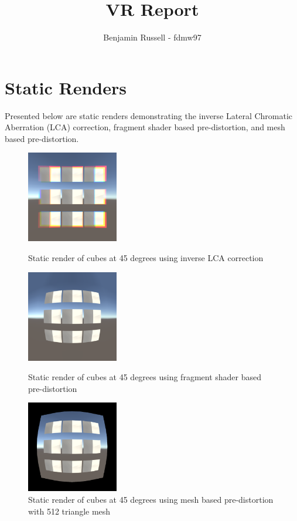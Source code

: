 \documentclass[]{article}
\title{VR Report}
\author{Benjamin Russell - fdmw97}
\date{}
\begin{document}
\maketitle

\section{Static Renders}
Presented below are static renders demonstrating the inverse Lateral Chromatic Aberration (LCA) correction, fragment shader based pre-distortion, and mesh based pre-distortion.
\begin{figure}[h!]
	\centering
	\begin{minipage}[H]{0.2\textwidth}
		\includegraphics[width=4cm]{LCA_45}
		\caption{Static render of cubes at 45 degrees using inverse LCA correction}
		\label{fig:lca_45}
	\end{minipage}
	\hfill
	\begin{minipage}[H]{0.2\textwidth}
		\includegraphics[width=4cm]{Barrel_Frag_45}
		\caption{Static render of cubes at 45 degrees using fragment shader based pre-distortion}
		\label{fig:frag_45}
	\end{minipage}
	\hfill
	\begin{minipage}[H!]{0.2\textwidth}
		\includegraphics[width=4cm]{Barrel_Vec_45}
		\caption{Static render of cubes at 45 degrees using mesh based pre-distortion with 512 triangle mesh}
		\label{fig:vec_45}
	\end{minipage}
\end{figure}
\end{document}

